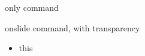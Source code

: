 \begin{frame}{only command}


\end{frame}

\begin{frame}{onslide command, with transparency}
\begin{itemize}
    \item this
\end{itemize}
\end{frame}